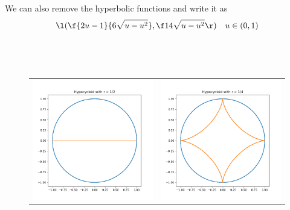 \documentclass[a4paper]{article}
\begin{document}
We can also remove the hyperbolic functions and write it as $$\l( \f{2u-1}{6\sqrt{u - u^2}}, \f1{4\sqrt{u - u^2}} \r) \quad u \in (0, 1)$$


\subsection{~}

\begin{figure}[h]
	\centering
	\begin{tabular}{cc}
		\includegraphics[scale=0.4]{Q3a-1} & \includegraphics[scale=0.4]{Q3a-2}\\

\end{tabular}
\end{figure}
\end{document}
